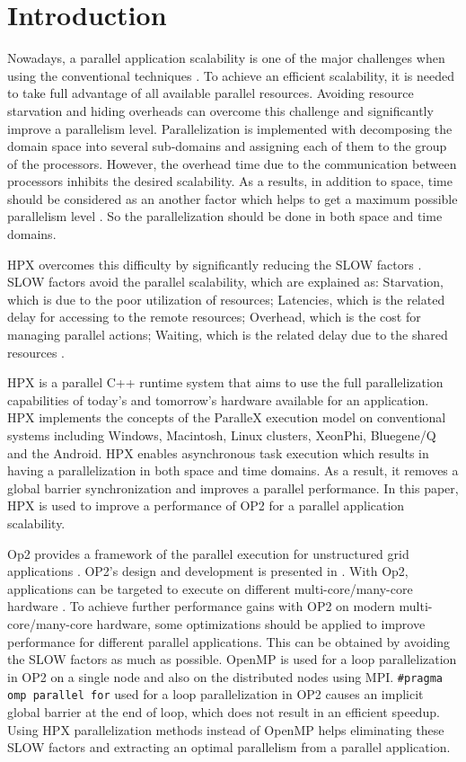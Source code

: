 \documentclass[conference]{IEEEtran}
\begin{document}
\section{Introduction}
Nowadays, a parallel application scalability is one of the major challenges when using the conventional techniques \cite{r11,r12}. To achieve an efficient scalability, it is needed to take full advantage of all available parallel resources. Avoiding resource starvation and hiding overheads can overcome this challenge and significantly improve a parallelism level. Parallelization is implemented with decomposing the domain space into several sub-domains and assigning each of them to the group of the processors. However, the overhead time due to the communication between processors inhibits the desired scalability. As a results, in addition to space, time should be considered as an another factor which helps to get a maximum possible parallelism level\cite{r7} \cite{r14}. So the parallelization should be done in both space and time domains. 

HPX \cite{r19} overcomes this difficulty by significantly reducing the SLOW factors \cite{r6}. SLOW factors avoid the parallel scalability, which are explained as: Starvation, which is due to the poor utilization of resources; Latencies, which is the related delay for accessing to the remote resources; Overhead, which is the cost for managing parallel actions; Waiting, which is the related delay due to the shared resources \cite{r7}. 

HPX is a parallel C++ runtime system that aims to use the full parallelization capabilities of today's and tomorrow's hardware available for an application. HPX implements the concepts of the ParalleX execution model \cite{o9,o10,o11} on conventional systems including Windows, Macintosh, Linux clusters, XeonPhi, Bluegene/Q and the Android. HPX enables asynchronous task execution which results in having a parallelization in both space and time domains. As a result, it removes a global barrier synchronization and improves a parallel performance. In this paper, HPX is used to improve a performance of OP2 for a parallel application scalability.

Op2 provides a framework of the parallel execution for unstructured grid applications \cite{o1}. OP2's design and development is presented in \cite{o2,o12}. With Op2, applications can be targeted to execute on different multi-core/many-core hardware \cite{o2,o3}. To achieve further performance gains with OP2 on modern multi-core/many-core hardware, some optimizations should be applied to improve performance for different parallel applications. This can be obtained by avoiding the SLOW factors as much as possible. OpenMP is used for a loop parallelization in OP2 on a single node and also on the distributed nodes using MPI. \texttt{\#pragma omp parallel for} used for a loop parallelization in OP2 causes an implicit global barrier at the end of loop, which does not result in an efficient speedup. Using HPX parallelization methods instead of OpenMP helps eliminating these SLOW factors and extracting an optimal parallelism from a parallel application.
\end{document}

